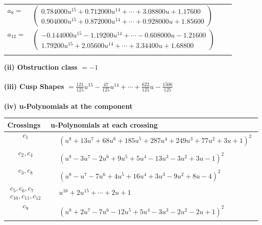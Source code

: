 \documentclass[1p]{elsarticle_modified}
\theoremstyle{definition}
\begin{document}
\begin{tabular}{m{7pt} m{180pt} m{7pt} m{180pt} }
\flushright $a_{8}=$&$\begin{pmatrix}0.784000 u^{15}+0.712000 u^{14}+\cdots+3.08800 u+1.17600\\0.904000 u^{15}+0.872000 u^{14}+\cdots+0.928000 u+1.85600\end{pmatrix}$ \\
\flushright $a_{12}=$&$\begin{pmatrix}-0.144000 u^{15}-1.19200 u^{14}+\cdots-0.608000 u-1.21600\\1.79200 u^{15}+2.05600 u^{14}+\cdots+3.34400 u+1.68800\end{pmatrix}$\\&\end{tabular}
\flushleft \textbf{(ii) Obstruction class $= -1$}\\~\\
\flushleft \textbf{(iii) Cusp Shapes $= \frac{121}{125} u^{15}-\frac{47}{125} u^{14}+\cdots+\frac{622}{125} u-\frac{1506}{125}$}\\~\\
\newpage\renewcommand{\arraystretch}{1}
\flushleft \textbf{(iv) u-Polynomials at the component}\newline \\
\begin{tabular}{m{50pt}|m{274pt}}
Crossings & \hspace{64pt}u-Polynomials at each crossing \\
\hline $$\begin{aligned}c_{1}\end{aligned}$$&$\begin{aligned}
&(u^8+13 u^7+68 u^6+185 u^5+287 u^4+249 u^3+77 u^2+3 u+1)^2
\end{aligned}$\\
\hline $$\begin{aligned}c_{2},c_{4}\end{aligned}$$&$\begin{aligned}
&(u^8-3 u^7-2 u^6+9 u^5+5 u^4-13 u^3-3 u^2+3 u-1)^2
\end{aligned}$\\
\hline $$\begin{aligned}c_{3},c_{8}\end{aligned}$$&$\begin{aligned}
&(u^8- u^7-7 u^6+4 u^5+16 u^4+3 u^3-9 u^2+8 u-4)^2
\end{aligned}$\\
\hline $$\begin{aligned}c_{5},c_{6},c_{7}\\c_{10},c_{11},c_{12}\end{aligned}$$&$\begin{aligned}
&u^{16}+2 u^{15}+\cdots+2 u+1
\end{aligned}$\\
\hline $$\begin{aligned}c_{9}\end{aligned}$$&$\begin{aligned}
&(u^8+2 u^7-7 u^6-12 u^5+5 u^4-3 u^3-2 u^2-2 u+1)^2
\end{aligned}$\\
\hline
\end{tabular}\\~\\
\end{document}
